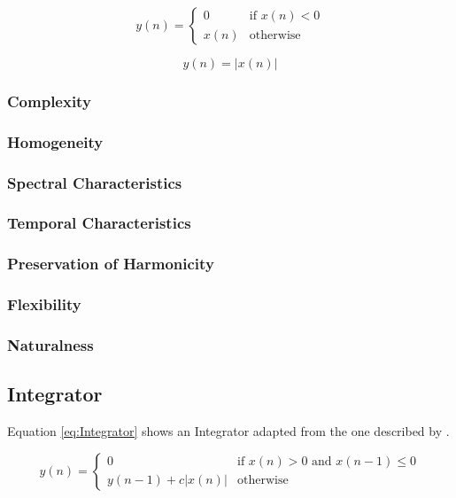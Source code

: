 		\begin{equation}
			y(n) = \begin{cases}
				0 & \text{if $x(n) < 0$} \\
				x(n) & \text{otherwise}
			\end{cases}
			\label{eq:HalfWaveRectification}
		\end{equation}

		\begin{equation}
			y(n) = |x(n)|
			\label{eq:FullWaveRectification}
		\end{equation}

		\subsubsection*{Complexity}
		\subsubsection*{Homogeneity}
		\subsubsection*{Spectral Characteristics}
		\subsubsection*{Temporal Characteristics}
		\subsubsection*{Preservation of Harmonicity}
		\subsubsection*{Flexibility}
		\subsubsection*{Naturalness}

	\subsection{Integrator}
	\label{sec:Excitation-Integrator}
		Equation \ref{eq:Integrator} shows an Integrator adapted from the one described by \citet{larsen2004audio}.

		\begin{equation}
			y(n) = \begin{cases}
				0 & \text{if $x(n) > 0$ and $x(n - 1) \leq 0$} \\
				y(n - 1) + c|x(n)| & \text{otherwise}
			\end{cases}
			\label{eq:Integrator}
		\end{equation}

